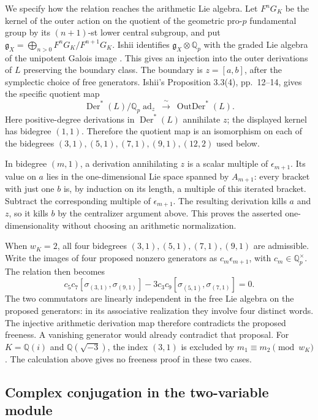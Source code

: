 We specify how the relation reaches the arithmetic Lie algebra.
Let \(F^nG_K\) be the kernel of the outer action on the quotient
of the geometric pro-\(p\) fundamental group by its \((n+1)\)-st
lower central subgroup, and put
\(\mathfrak g_X=\bigoplus_{n>0}F^nG_K/F^{n+1}G_K\).
Ishii identifies \(\mathfrak g_X\otimes\mathbb Q_p\) with the
graded Lie algebra of the unipotent Galois image
\cite[Lemma 3.6, p.~14]{IshiiLie}. This gives an injection into
the outer derivations of \(L\) preserving the boundary class.
The boundary is \(z=[a,b]\), after the symplectic choice of free
generators. Ishii's Proposition 3.3(4), pp.~12--14, gives the
specific quotient map
\[
 \operatorname{Der}^{*}(L)/\mathbb Q_p\operatorname{ad}_z
       \ \xrightarrow{\ \sim\ }\ \operatorname{OutDer}^{*}(L).
\]
Here positive-degree derivations in \(\operatorname{Der}^{*}(L)\)
annihilate \(z\); the displayed kernel has bidegree \((1,1)\).
Therefore the quotient map is an isomorphism on each of the
bidegrees \((3,1),(5,1),(7,1),(9,1),(12,2)\) used below.

In bidegree \((m,1)\), a derivation annihilating \(z\) is a scalar
multiple of \(\epsilon_{m+1}\). Its value on \(a\) lies in the
one-dimensional Lie space spanned by \(A_{m+1}\): every bracket
with just one \(b\) is, by induction on its length, a multiple of
this iterated bracket. Subtract the corresponding multiple of
\(\epsilon_{m+1}\). The resulting derivation kills \(a\) and \(z\),
so it kills \(b\) by the centralizer argument above. This proves
the asserted one-dimensionality without choosing an arithmetic
normalization.

When \(w_K=2\), all four bidegrees \((3,1),(5,1),(7,1),(9,1)\)
are admissible. Write the images of four proposed nonzero generators
as \(c_m\epsilon_{m+1}\), with \(c_m\in\mathbb Q_p^\times\).
The relation then becomes
\[
 c_5c_7[\sigma_{(3,1)},\sigma_{(9,1)}]
 -3c_3c_9[\sigma_{(5,1)},\sigma_{(7,1)}]=0.
\]
The two commutators are linearly independent in the free Lie algebra
on the proposed generators: in its associative realization they
involve four distinct words. The injective arithmetic derivation
map therefore contradicts the proposed freeness. A vanishing
generator would already contradict that proposal.
For \(K=\mathbb Q(i)\) and \(\mathbb Q(\sqrt{-3})\), the index
\((3,1)\) is excluded by \(m_1\equiv m_2\pmod {w_K}\).
The calculation above gives no freeness proof in these two cases.

\subsection{Complex conjugation in the two-variable module}

